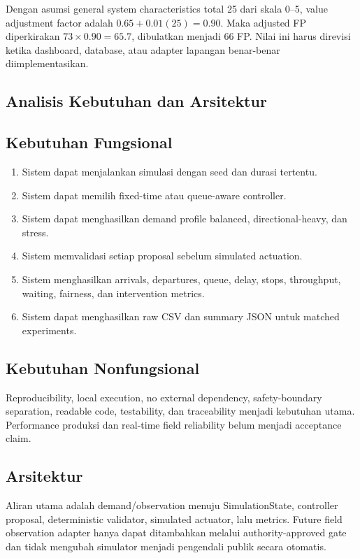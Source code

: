 \documentclass[12pt]{article}
\begin{document}
Dengan asumsi general system characteristics total 25 dari skala 0--5, value adjustment factor adalah \(0.65 + 0.01(25)=0.90\). Maka adjusted FP diperkirakan \(73\times0.90=65.7\), dibulatkan menjadi 66 FP. Nilai ini harus direvisi ketika dashboard, database, atau adapter lapangan benar-benar diimplementasikan.

\subsection{Analisis Kebutuhan dan Arsitektur}
\subsection{Kebutuhan Fungsional}
\begin{enumerate}
  \item Sistem dapat menjalankan simulasi dengan seed dan durasi tertentu.
  \item Sistem dapat memilih fixed-time atau queue-aware controller.
  \item Sistem dapat menghasilkan demand profile balanced, directional-heavy, dan stress.
  \item Sistem memvalidasi setiap proposal sebelum simulated actuation.
  \item Sistem menghasilkan arrivals, departures, queue, delay, stops, throughput, waiting, fairness, dan intervention metrics.
  \item Sistem dapat menghasilkan raw CSV dan summary JSON untuk matched experiments.
\end{enumerate}

\subsection{Kebutuhan Nonfungsional}
Reproducibility, local execution, no external dependency, safety-boundary separation, readable code, testability, dan traceability menjadi kebutuhan utama. Performance produksi dan real-time field reliability belum menjadi acceptance claim.

\subsection{Arsitektur}
Aliran utama adalah demand/observation menuju SimulationState, controller proposal, deterministic validator, simulated actuator, lalu metrics. Future field observation adapter hanya dapat ditambahkan melalui authority-approved gate dan tidak mengubah simulator menjadi pengendali publik secara otomatis.
\end{document}
